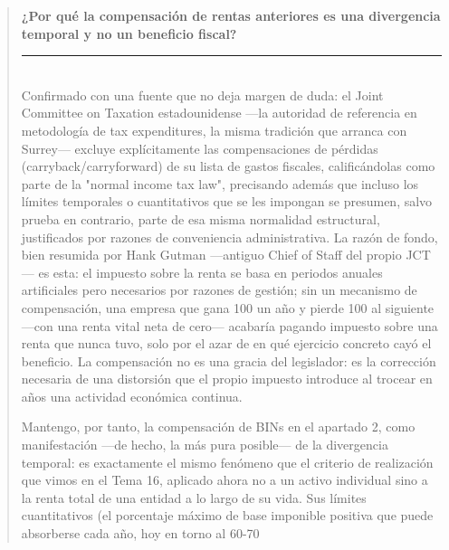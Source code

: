 \documentclass[10pt,a4paper]{article}
\newenvironment{specialblock}[1]{%
      \begin{quote} %
      \small %
      \noindent\textbf{#1}\\[-0.3em] %
      \rule{\linewidth}{0.4pt}\\[0.6em]}{
      \end{quote}}
\begin{document}
\begin{specialblock}{¿Por qué la compensación de rentas anteriores es una divergencia temporal y no un beneficio fiscal?}
    Confirmado con una fuente que no deja margen de duda: el Joint Committee on Taxation estadounidense —la autoridad de referencia en metodología de tax expenditures, la misma tradición que arranca con Surrey— excluye explícitamente las compensaciones de pérdidas (carryback/carryforward) de su lista de gastos fiscales, calificándolas como parte de la "normal income tax law", precisando además que incluso los límites temporales o cuantitativos que se les impongan se presumen, salvo prueba en contrario, parte de esa misma normalidad estructural, justificados por razones de conveniencia administrativa. La razón de fondo, bien resumida por Hank Gutman —antiguo Chief of Staff del propio JCT— es esta: el impuesto sobre la renta se basa en periodos anuales artificiales pero necesarios por razones de gestión; sin un mecanismo de compensación, una empresa que gana 100 un año y pierde 100 al siguiente —con una renta vital neta de cero— acabaría pagando impuesto sobre una renta que nunca tuvo, solo por el azar de en qué ejercicio concreto cayó el beneficio. La compensación no es una gracia del legislador: es la corrección necesaria de una distorsión que el propio impuesto introduce al trocear en años una actividad económica continua.

    Mantengo, por tanto, la compensación de BINs en el apartado 2, como manifestación —de hecho, la más pura posible— de la divergencia temporal: es exactamente el mismo fenómeno que el criterio de realización que vimos en el Tema 16, aplicado ahora no a un activo individual sino a la renta total de una entidad a lo largo de su vida. Sus límites cuantitativos (el porcentaje máximo de base imponible positiva que puede absorberse cada año, hoy en torno al 60-70%


\end{specialblock}
\end{document}
